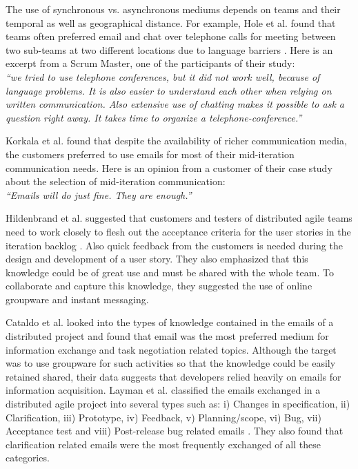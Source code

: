 The use of synchronous vs. asynchronous mediums depends on teams and their temporal as well as geographical distance. For example, Hole et al. found that teams often preferred email and chat over telephone calls for meeting between two sub-teams at two different locations due to language barriers \cite{a_case_study_of}. Here is an excerpt from a Scrum Master, one of the participants of their study:\\
\emph{``we tried to use telephone conferences, but it did not work well, because of language problems. It is also easier to understand each other when relying on written communication. Also extensive use of chatting makes it possible to ask a question right away. It takes time to organize a telephone-conference.''}

Korkala et al. found that despite the availability of richer communication media, the customers preferred to use emails for most of their mid-iteration communication needs\cite{korkala}. Here is an opinion from a customer of their case study about the selection of mid-iteration communication:\\
\emph{``Emails will do just fine. They are enough.''}

Hildenbrand et al. suggested that customers and testers of distributed agile teams need to work closely to flesh out the acceptance criteria for the user stories in the iteration backlog \cite{agile_methods}. Also quick feedback from the customers is needed during the design and development of a user story. They also emphasized that this knowledge could be of great use and must be shared with the whole team. To collaborate and capture this knowledge, they suggested the use of online groupware and instant messaging.

Cataldo et al. looked into the types of knowledge contained in the emails of a distributed project and found that email was the most preferred medium for information exchange and task negotiation related topics\cite{on_coordination}. Although the target was to use groupware for such activities so that the knowledge could be easily retained shared, their data suggests that developers relied heavily on emails for information acquisition. Layman et al. classified the emails exchanged in a distributed agile project into several types such as: i) Changes in specification, ii) Clarification, iii) Prototype, iv) Feedback, v) Planning/scope, vi) Bug, vii) Acceptance test and viii) Post-release bug related emails \cite{essential_communication}. They also found that clarification related emails were the most frequently exchanged of all these categories.


